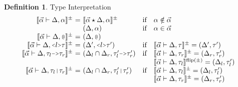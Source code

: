 \documentclass[acmsmall]{acmart}
\theoremstyle{definition}
\newtheorem{definition}{Definition}[section]
\begin{document}
\begin{definition} 
  \label{def:type_interpretation}
  Type Interpretation 
  \hfill
  \\
  \[
  \begin{array}[t]{r@{}c@{}lcl}
      \llbracket \vec{\alpha} \entails \Delta, \alpha \rrbracket^\pm 
      &\ =\ & 
      \llbracket \vec{\alpha} \star \Delta, \alpha \rrbracket^\pm
      &\text{if}& 
      \alpha \notin \vec{\alpha}

      \\

      &&
      (\Delta, \alpha)
      &\text{if}&
      \alpha \in \vec{\alpha}

      \\

      \llbracket \vec{\alpha} \entails \Delta, \J{@} \rrbracket^\pm 
      &\ =\ & 
      (\Delta, \J{@})
      &&

      \\

      \llbracket \vec{\alpha} \entails \Delta, \J{<}l\J{>}\tau \rrbracket^\pm
      &\ =\ & 
      (\Delta', \J{<}l\J{>}\tau')
      &\text{if}& 
      \llbracket \vec{\alpha} \entails \Delta, \tau \rrbracket^\pm = (\Delta', \tau')

      \\

      \llbracket \vec{\alpha} \entails \Delta, \tau_l\J{->}\tau_r \rrbracket^\pm 
      &\ =\ & 
      (\Delta_l \cap \Delta_r, \tau_l'\J{->}\tau_r')
      &\text{if}& 
      \begin{array}[t]{@{}l}
        \llbracket \vec{\alpha} \entails \Delta, \tau_r \rrbracket^\pm = (\Delta_r, \tau_r')
        \\
        \llbracket \vec{\alpha} \entails \Delta, \tau_l \rrbracket^{\text{flip}(\pm)} = (\Delta_l, \tau_l')
      \end{array}

      \\

      \llbracket \vec{\alpha} \entails \Delta, \tau_l\J{|}\tau_r \rrbracket^\pm
      &\ =\ & 
      (\Delta_l \cap \Delta_r, \tau_l'\J{|}\tau_r')
      &\text{if}& 
      \begin{array}[t]{@{}l}
        \llbracket \vec{\alpha} \entails \Delta, \tau_l \rrbracket^\pm = (\Delta_l, \tau_l')
        \\
        \llbracket \vec{\alpha} \entails \Delta, \tau_r \rrbracket^{\pm} = (\Delta_r, \tau_r')
      \end{array}


\end{array}\]
\end{definition}
\end{document}
